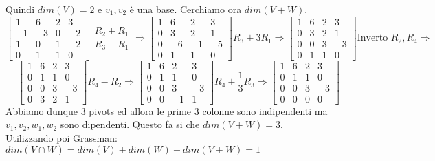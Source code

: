 \begin{example}
Quindi $dim(V) = 2$ e $v_1, v_2$ è una base. Cerchiamo ora $dim(V + W)$.
\[
\begin{bmatrix}
1 & 6 & 2 & 3\\
-1 & -3 & 0 & -2\\
1 & 0 & 1 & -2\\
0 & 1 & 1 & 0
\end{bmatrix}
\begin{array}{l}
R_2 + R_1\\
R_3 - R_1
\end{array}
\Rightarrow
\begin{bmatrix}
1 & 6 & 2 & 3\\
0 & 3 & 2 & 1\\
0 & -6 & -1 & -5\\
0 & 1 & 1 & 0
\end{bmatrix}
R_3 + 3R_1
\Rightarrow
\begin{bmatrix}
1 & 6 & 2 & 3\\
0 & 3 & 2 & 1\\
0 & 0 & 3 & -3\\
0 & 1 & 1 & 0
\end{bmatrix}
\text{Inverto } R_2, R_4
\Rightarrow
\]
\[
\begin{bmatrix}
1 & 6 & 2 & 3\\
0 & 1 & 1 & 0\\
0 & 0 & 3 & -3\\
0 & 3 & 2 & 1
\end{bmatrix}
R_4 - R_2
\Rightarrow
\begin{bmatrix}
1 & 6 & 2 & 3\\
0 & 1 & 1 & 0\\
0 & 0 & 3 & -3\\
0 & 0 & -1 & 1
\end{bmatrix}
R_4 + \frac{1}{3}R_3
\Rightarrow
\begin{bmatrix}
1 & 6 & 2 & 3\\
0 & 1 & 1 & 0\\
0 & 0 & 3 & -3\\
0 & 0 & 0 & 0
\end{bmatrix}
\]
Abbiamo dunque 3 pivots ed allora le prime 3 colonne sono indipendenti ma $v_1, v_2, w_1, w_2$ sono dipendenti. Questo fa si che $dim(V+W) =$3.\\
Utilizzando poi Grassman: $dim(V \cap W) = dim(V) + dim(W) - dim(V+W) = 1$
\end{example}

